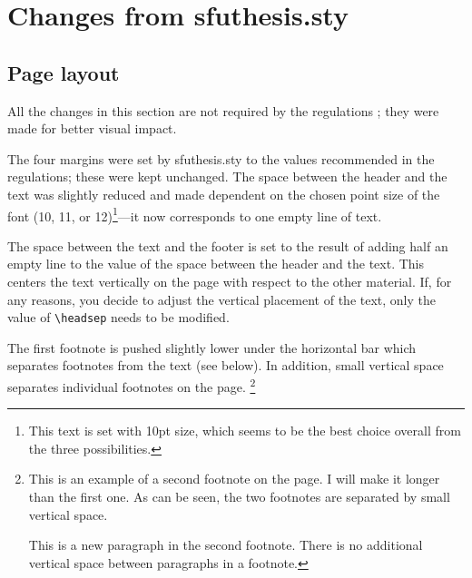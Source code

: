 
%
%

\chapter{Changes from \textsf{sfuthesis.sty}}
\label{two}

\section{Page layout}

All the changes in
this section are not required by the regulations%
; they were made for better visual impact.

The four margins were set by \textsf{sfuthesis.sty}%
 to the values recommended
in the regulations; these were kept
unchanged. The space between the header and the text was
slightly reduced and made dependent on the chosen point size of the
font (10, 11, or 12)\footnote{This text is set with 10pt size, which
  seems to be the best choice overall from the three
  possibilities.}---it now corresponds to one empty line of text.

The space between the text and the footer is set to the result of
adding half an empty line to the value of the space between the header
and the text. This centers the text vertically on the page with
respect to the other material. If, for any reasons, you decide to
adjust the vertical placement of the text, only the value of
\verb+\headsep+ needs to be modified.

The first footnote is pushed slightly lower under the
horizontal bar which separates footnotes from the text (see below). In
addition,
small vertical space separates individual footnotes on the page.\label{foot}%
\footnote{This is an example of a second footnote on the page. I will
  make it longer than the first one. As can be seen, the two footnotes
  are separated by small vertical space.

  This is a new paragraph in the second footnote. There is no
  additional vertical space between
  paragraphs in a footnote.}

